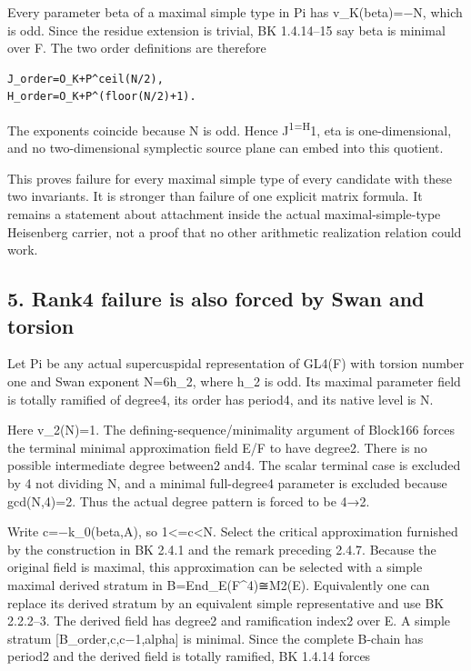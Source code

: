 Every parameter beta of a maximal simple type in Pi has v\_K(beta)=−N,
which is odd. Since the residue extension is trivial, BK 1.4.14--15 say
beta is minimal over F. The two order definitions are therefore

\begin{Verbatim}[fontsize=\small,breaklines=true,breakanywhere=true]
J_order=O_K+P^ceil(N/2),
H_order=O_K+P^(floor(N/2)+1).
\end{Verbatim}

The exponents coincide because N is odd. Hence J\textsuperscript{1=H}1,
eta is one-dimensional, and no two-dimensional symplectic source plane
can embed into this quotient.

This proves failure for every maximal simple type of every candidate
with these two invariants. It is stronger than failure of one explicit
matrix formula. It remains a statement about attachment inside the
actual maximal-simple-type Heisenberg carrier, not a proof that no other
arithmetic realization relation could work.

\hypertarget{dyadic_capacity-rank4-failure-is-also-forced-by-swan-and-torsion}{%
\subsection{5. Rank4 failure is also forced by Swan and
torsion}\label{dyadic_capacity-rank4-failure-is-also-forced-by-swan-and-torsion}}

Let Pi be any actual supercuspidal representation of GL4(F) with torsion
number one and Swan exponent N=6h\_2, where h\_2 is odd. Its maximal
parameter field is totally ramified of degree4, its order has period4,
and its native level is N.

Here v\_2(N)=1. The defining-sequence/minimality argument of Block166
forces the terminal minimal approximation field E/F to have degree2.
There is no possible intermediate degree between2 and4. The scalar
terminal case is excluded by 4 not dividing N, and a minimal
full-degree4 parameter is excluded because gcd(N,4)=2. Thus the actual
degree pattern is forced to be 4→2.

Write c=−k\_0(beta,A), so 1\textless=c\textless N. Select the critical
approximation furnished by the construction in BK 2.4.1 and the remark
preceding 2.4.7. Because the original field is maximal, this
approximation can be selected with a simple maximal derived stratum in
B=End\_E(F\^{}4)≅M2(E). Equivalently one can replace its derived stratum
by an equivalent simple representative and use BK 2.2.2--3. The derived
field has degree2 and ramification index2 over E. A simple stratum
{[}B\_order,c,c−1,alpha{]} is minimal. Since the complete B-chain has
period2 and the derived field is totally ramified, BK 1.4.14 forces

